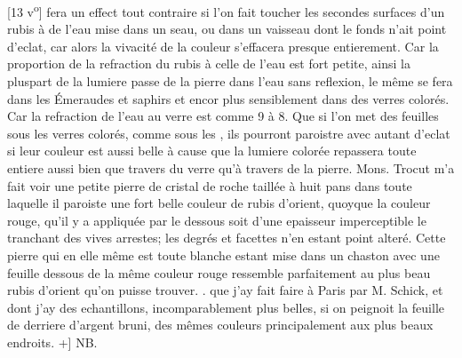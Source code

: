 [13 v\textsuperscript{o}] fera un effect tout contraire si l'on fait toucher les secondes surfaces d'un rubis \`{a}  de l'eau mise dans un seau, ou dans un vaisseau dont le fonds n'ait point d'eclat, car alors la vivacit\'{e} de la couleur s'effacera presque entierement. Car la proportion de la refraction\protect{} du rubis \`{a} celle de l'eau est fort petite, ainsi la pluspart de la lumiere\protect{} passe de la pierre dans l'eau sans reflexion\protect{}, le même se fera dans les \'{E}meraudes et saphirs et encor plus sensiblement dans des verres color\'{e}s. Car la refraction\protect{} de l'eau au verre est comme 9 \`{a} 8. Que si l'on met des feuilles sous les verres color\'{e}s, comme sous les , ils pourront paroistre avec autant d'eclat si leur couleur est aussi belle \`{a} cause que la lumiere\protect{} color\'{e}e repassera toute entiere aussi bien que travers du verre qu'\`{a} travers de la pierre. \pend \pstart Mons. Trocut\protect{} m'a fait voir une petite pierre de cristal de roche taill\'{e}e \`{a} huit pans dans toute laquelle il paroiste une fort belle couleur de rubis d'orient, quoyque la couleur rouge, qu'il y a appliqu\'{e}e par le dessous soit d'une epaisseur imperceptible le tranchant des vives arrestes; les degr\'{e}s et facettes n'en estant point alter\'{e}. Cette pierre qui en elle même est toute blanche estant mise dans un chaston avec une feuille dessous de la même couleur rouge ressemble parfaitement au plus beau rubis d'orient qu'on puisse trouver. \pend \pstart \edtext{[+ NB\edlabel{Klammer1start}}{{\xxref{Klammer1start}{Klammer1end}}\lemma{}\Afootnote{[...] \textit{Klammern von Leibniz}}}.  que j'ay fait faire \`{a} Paris\protect{} par M. Schick\protect{}, et dont j'ay des echantillons,  incomparablement plus belles, si on peignoit la feuille de derriere d'argent bruni, des mêmes couleurs principalement aux plus beaux endroits. +] NB.\pend 